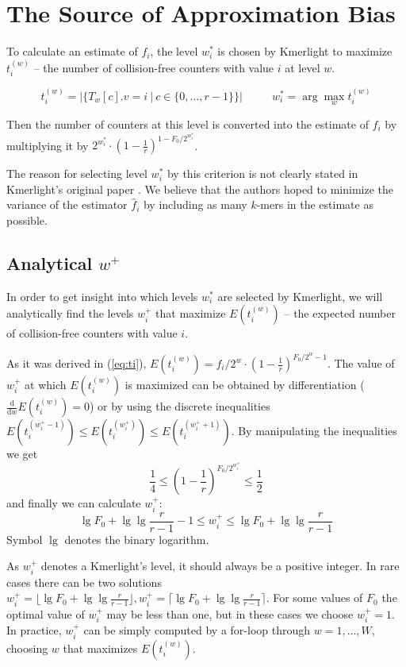 \section{The Source of Approximation Bias}
\label{sec:source-of-bias}

To calculate an estimate of $f_i$, the level $w_i^*$ is chosen by Kmerlight
to maximize $t_i^{(w)}$ -- the number of collision-free counters with value $i$ at level $w$.

$$t_i^{(w)} = |\{T_w[c].v = i ~|~ c \in \{0, \dots, r-1\}\}| 
~~~~~~~~~~~~ w_i^* = \arg\max_w t_i^{(w)}$$

Then the number of counters at this level is converted into the estimate of
$f_i$ by multiplying it by $2^{w^*_i} \cdot \left(1 - \frac{1}{r}\right)^{1 - F_0/2^{w^*_i}}$. 

The reason for selecting level $w_i^*$ by this criterion 
is not clearly stated in Kmerlight's original paper \cite{Sivadasan2016}. 
We believe that the authors hoped to minimize the variance of the estimator $\hat f_i$
by including as many $k$-mers in the estimate as possible.

\subsection{Analytical $w^+$}
\label{sec:analytical-w}
In order to get insight into which levels $w_i^*$ are selected by Kmerlight, 
we will analytically find the levels $w_i^+$ that maximize $E(t_i^{(w)})$ -- the expected number 
of collision-free counters with value $i$.

As it was derived in (\ref{eq:ti}), 
$E(t_i^{(w)}) = f_i / 2^w \cdot \left(1 - \frac{1}{r}\right)^{F_0/2^w - 1}$.
The value of $w_i^+$ at which $E(t_i^{(w)})$ is maximized can be obtained by differentiation 
($\frac{\mathrm{d}}{\mathrm{d}w}E(t_i^{(w)}) = 0$) or by using the discrete inequalities 
$E(t_i^{(w^+_i-1)}) \leq E(t_i^{(w^+_i)}) \leq E(t_i^{(w^+_i+1)})$. 
By manipulating the inequalities we get
\begin{equation} \label{eq:wplusbounds}
\frac{1}{4} \leq \left(1 - \frac{1}{r}\right)^{F_0/2^{w^+_i}} \leq \frac{1}{2}
\end{equation}
and finally we can calculate $w_i^+$:
$$\lg F_0 + \lg\lg \frac{r}{r-1}-1 \leq w_i^+ \leq \lg F_0 + \lg\lg \frac{r}{r-1}$$
Symbol $\lg$ denotes the binary logarithm. 

As $w_i^+$ denotes a Kmerlight's level, it should always be a positive integer.
In rare cases there can be two solutions $w_i^+ = \lfloor \lg F_0 + \lg\lg \frac{r}{r-1} \rfloor,
w_i^+ = \lceil \lg F_0 + \lg\lg \frac{r}{r-1} \rceil$. For some values of $F_0$ the optimal 
value of $w_i^+$ may be less than one, but in these cases we choose $w_i^+=1$. In practice,
$w^+_i$ can be simply computed by a for-loop through $w=1, \dots, W$, choosing $w$ that
maximizes $E(t_i^{(w)})$. 

